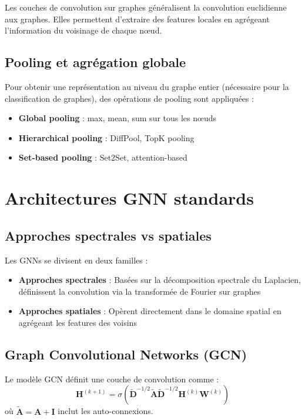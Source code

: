 Les couches de convolution sur graphes généralisent la convolution euclidienne aux graphes. Elles permettent d'extraire des features locales en agrégeant l'information du voisinage de chaque nœud.

\subsection{Pooling et agrégation globale}

Pour obtenir une représentation au niveau du graphe entier (nécessaire pour la classification de graphes), des opérations de pooling sont appliquées :
\begin{itemize}
    \item \textbf{Global pooling} : max, mean, sum sur tous les nœuds
    \item \textbf{Hierarchical pooling} : DiffPool, TopK pooling
    \item \textbf{Set-based pooling} : Set2Set, attention-based
\end{itemize}

\section{Architectures GNN standards}

\subsection{Approches spectrales vs spatiales}

Les GNNs se divisent en deux familles :
\begin{itemize}
    \item \textbf{Approches spectrales} : Basées sur la décomposition spectrale du Laplacien, définissent la convolution via la transformée de Fourier sur graphes
    \item \textbf{Approches spatiales} : Opèrent directement dans le domaine spatial en agrégeant les features des voisins
\end{itemize}

\subsection{Graph Convolutional Networks (GCN)}

Le modèle GCN définit une couche de convolution comme :
\[
\mathbf{H}^{(k+1)} = \sigma(\tilde{\mathbf{D}}^{-1/2}\tilde{\mathbf{A}}\tilde{\mathbf{D}}^{-1/2}\mathbf{H}^{(k)}\mathbf{W}^{(k)})
\]
où $\tilde{\mathbf{A}} = \mathbf{A} + \mathbf{I}$ inclut les auto-connexions.

